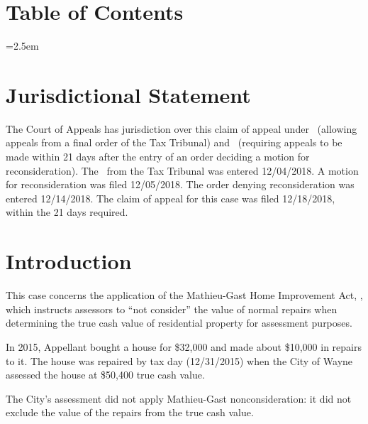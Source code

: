 \documentclass[12pt,\documentclassflag]{michiganCourtOfAppealsBrief}
\begin{document}
\section*{Table of Contents}

\tableofcontents

\newpage
\tableofauthorities

\pagestyle{plain}



\parindent=2.5em
\doublespacing

\section{Jurisdictional Statement}
 
The Court of Appeals has jurisdiction over this claim of appeal under \cite{MCL 205.753(2)}\ (allowing appeals from a final order of the Tax Tribunal) and \cite{MCR 7.204(A)(1)(b)}\ (requiring appeals to be made within 21 days after the entry of an order deciding a motion for reconsideration). The \fojAbbr\ from the Tax Tribunal was entered 12/04/2018. A motion for reconsideration was filed 12/05/2018. The order denying reconsideration was entered 12/14/2018. The claim of appeal for this case was filed 12/18/2018, within the 21 days required.

\newpage 
\section{Introduction}

This case concerns the application of the Mathieu-Gast Home Improvement Act, \cite[s]{MCL 211.27(2)}, which instructs assessors to ``not consider'' the value of normal repairs when determining the true cash value of residential property for assessment purposes.

In 2015, Appellant bought a house for \$32,000 and made about \$10,000 in repairs to it. The house was repaired by tax day (12/31/2015) when the City of Wayne assessed the house at \$50,400 true cash value.

The City's assessment did not apply Mathieu-Gast nonconsideration: it did not exclude the value of the repairs from the true cash value.
\end{document}
